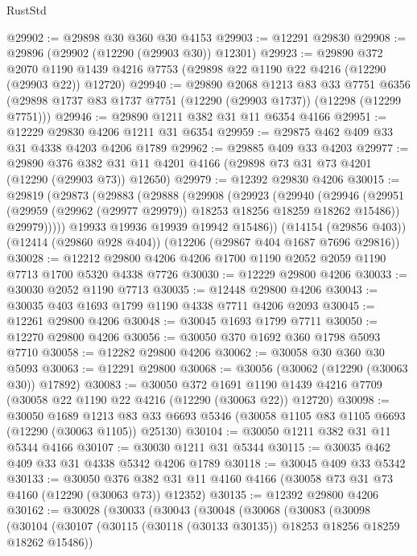 \begin{lexlean}{RustStd}
\begin{coremodule}
@29902 := @29898 @30 @360 @30 @4153
@29903 := @12291 @29830
@29908 := @29896 (@29902 (@12290 (@29903 @30)) @12301)
@29923 := @29890
    @372
    @2070
    @1190
    @1439
    @4216
    @7753
    (@29898 @22 @1190 @22 @4216 (@12290 (@29903 @22)) @12720)
@29940 := @29890
    @2068
    @1213
    @83
    @33
    @7751
    @6356
    (@29898 @1737 @83 @1737 @7751 (@12290 (@29903 @1737)) (@12298 (@12299 @7751)))
@29946 := @29890 @1211 @382 @31 @11 @6354 @4166
@29951 := @12229 @29830 @4206 @1211 @31 @6354
@29959 := @29875 @462 @409 @33 @31 @4338 @4203 @4206 @1789
@29962 := @29885 @409 @33 @4203
@29977 := @29890
    @376
    @382
    @31
    @11
    @4201
    @4166
    (@29898 @73 @31 @73 @4201 (@12290 (@29903 @73)) @12650)
@29979 := @12392 @29830 @4206
@30015 := @29819
    (@29873
      (@29883
        (@29888
          (@29908
            (@29923
              (@29940
                (@29946
                  (@29951 (@29959 (@29962 (@29977 @29979)) @18253 @18256 @18259 @18262 @15486))
                  @29979)))))
        @19933
        @19936
        @19939
        @19942
        @15486))
    (@14154 (@29856 @403))
    (@12414 (@29860 @928 @404))
    (@12206 (@29867 @404 @1687 @7696 @29816))
@30028 := @12212 @29800 @4206 @4206 @1700 @1190 @2052 @2059 @1190 @7713 @1700 @5320 @4338 @7726
@30030 := @12229 @29800 @4206
@30033 := @30030 @2052 @1190 @7713
@30035 := @12448 @29800 @4206
@30043 := @30035 @403 @1693 @1799 @1190 @4338 @7711 @4206 @2093
@30045 := @12261 @29800 @4206
@30048 := @30045 @1693 @1799 @7711
@30050 := @12270 @29800 @4206
@30056 := @30050 @370 @1692 @360 @1798 @5093 @7710
@30058 := @12282 @29800 @4206
@30062 := @30058 @30 @360 @30 @5093
@30063 := @12291 @29800
@30068 := @30056 (@30062 (@12290 (@30063 @30)) @17892)
@30083 := @30050
    @372
    @1691
    @1190
    @1439
    @4216
    @7709
    (@30058 @22 @1190 @22 @4216 (@12290 (@30063 @22)) @12720)
@30098 := @30050
    @1689
    @1213
    @83
    @33
    @6693
    @5346
    (@30058 @1105 @83 @1105 @6693 (@12290 (@30063 @1105)) @25130)
@30104 := @30050 @1211 @382 @31 @11 @5344 @4166
@30107 := @30030 @1211 @31 @5344
@30115 := @30035 @462 @409 @33 @31 @4338 @5342 @4206 @1789
@30118 := @30045 @409 @33 @5342
@30133 := @30050
    @376
    @382
    @31
    @11
    @4160
    @4166
    (@30058 @73 @31 @73 @4160 (@12290 (@30063 @73)) @12352)
@30135 := @12392 @29800 @4206
@30162 := @30028
    (@30033
      (@30043
        (@30048
          (@30068
            (@30083
              (@30098
                (@30104
                  (@30107 (@30115 (@30118 (@30133 @30135)) @18253 @18256 @18259 @18262 @15486))

\end{coremodule}
\end{lexlean}
